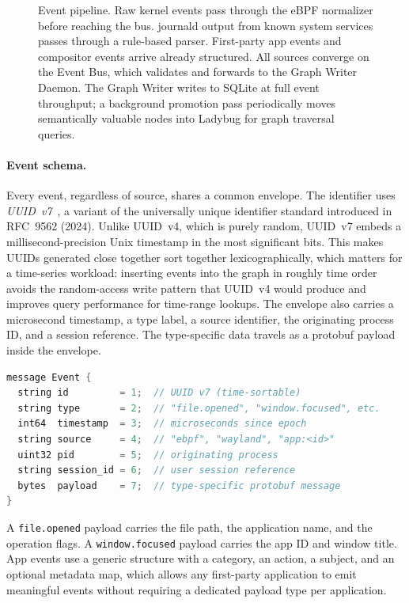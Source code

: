 \begin{figure}[htbp]
\begin{tikzpicture}
\end{tikzpicture}
\caption{Event pipeline. Raw kernel events pass through the eBPF normalizer
before reaching the bus. journald output from known system services passes
through a rule-based parser. First-party app events and compositor events
arrive already structured. All sources converge on the Event Bus, which
validates and forwards to the Graph Writer Daemon. The Graph Writer writes
to SQLite at full event throughput; a background promotion pass periodically
moves semantically valuable nodes into Ladybug for graph traversal queries.}
\label{fig:event-flow}
\end{figure}

\paragraph{Event schema.}
Every event, regardless of source, shares a common envelope. The identifier
uses \emph{UUID~v7}~\cite{rfc9562}, a variant of the universally unique
identifier standard introduced in RFC~9562 (2024). Unlike UUID~v4, which is
purely random, UUID~v7 embeds a millisecond-precision Unix timestamp in the
most significant bits. This makes UUIDs generated close together sort together
lexicographically, which matters for a time-series workload: inserting events
into the graph in roughly time order avoids the random-access write pattern
that UUID~v4 would produce and improves query performance for time-range
lookups. The envelope also carries a microsecond timestamp, a type label, a
source identifier, the originating process ID, and a session reference. The
type-specific data travels as a protobuf payload inside the envelope.

\begin{lstlisting}[language=C, caption={Common event envelope (protobuf)}]
message Event {
  string id         = 1;  // UUID v7 (time-sortable)
  string type       = 2;  // "file.opened", "window.focused", etc.
  int64  timestamp  = 3;  // microseconds since epoch
  string source     = 4;  // "ebpf", "wayland", "app:<id>"
  uint32 pid        = 5;  // originating process
  string session_id = 6;  // user session reference
  bytes  payload    = 7;  // type-specific protobuf message
}
\end{lstlisting}

A \texttt{file.opened} payload carries the file path, the application name,
and the operation flags. A \texttt{window.focused} payload carries the app ID
and window title. App events use a generic structure with a category, an
action, a subject, and an optional metadata map, which allows any first-party
application to emit meaningful events without requiring a dedicated payload
type per application.

